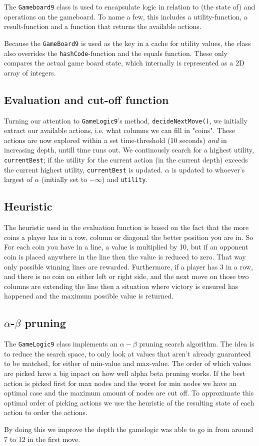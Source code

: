 The \texttt{Gameboard9} class is used to encapsulate logic in relation to (the state of) and operations on the gameboard. To name a few, this includes a utility-function, a result-function and a function that returns the available actions.

Because the \texttt{GameBoard9} is used as the key in a cache for utility values, the class also overrides the \texttt{hashCode}-function and the equals function. These only compares the actual game board state, which internally is represented as a 2D array of integers.

\subsection{Evaluation and cut-off function}

Turning our attention to \texttt{GameLogic9}'s method, \texttt{decideNextMove()}, we initially extract our available actions, i.e. what columns we can fill in "coins". These actions are now explored within a set time-threshold (10 seconds) \textit{and} in increasing depth, untill time runs out. We continously search for a highest utility, \texttt{currentBest}; if the utility for the current action (in the current depth) exceeds the current highest utility, \texttt{currentBest} is updated. $\alpha$ is updated to whoever's largest of $\alpha$ (initially set to $-\infty$) and \texttt{utility}.


\subsection{Heuristic}
The heuristic used in the evaluation function is based on the fact that the more coins a player has in a row, column or diagonal the better position you are in. So For each coin you have in a line, a value is multiplied by 10, but if an opponent coin is placed anywhere in the line then the value is reduced to zero. That way only possible winning lines are rewarded. Furthermore, if a player has 3 in a row, and there is no coin on either left or right side, and the next move on those two columns are extending the line then a situation where victory is ensured has happened and the maximum possible value is returned.

\subsection{$\alpha$-$\beta$ pruning}
The \texttt{GameLogic9} class implements an $\alpha-\beta$ pruning search algorithm. The idea is to reduce the search space, to only look at values that aren't already guaranteed to be matched, for either of min-value and max-value. The order of which values are picked have a big inpact on how well alpha beta pruning works. If the best action is picked first for max nodes and the worst for min nodes we have an optimal case and the maximum amount of nodes are cut off. To approximate this optimal order of picking actions we use the heuristic of the resulting state of each action to order the actions. 

By doing this we improve the depth the gamelogic was able to go in from around 7 to 12 in the first move.